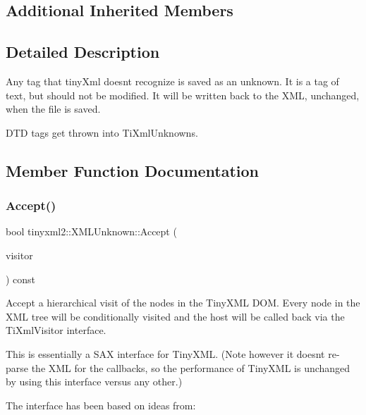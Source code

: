 \subsection*{Additional Inherited Members}


\subsection{Detailed Description}
Any tag that tiny\+Xml doesn\textquotesingle{}t recognize is saved as an unknown. It is a tag of text, but should not be modified. It will be written back to the X\+ML, unchanged, when the file is saved.

D\+TD tags get thrown into Ti\+Xml\+Unknowns. 

\subsection{Member Function Documentation}
\mbox{\label{classtinyxml2_1_1XMLUnknown_a8a06b8c82117ca969a432e17a46830fc}} 
\subsubsection{\texorpdfstring{Accept()}{Accept()}\hspace{0.1cm}{\footnotesize\ttfamily [1/2]}}
{\footnotesize\ttfamily bool tinyxml2\+::\+X\+M\+L\+Unknown\+::\+Accept (\begin{DoxyParamCaption}\item[{\hyperlink{classtinyxml2_1_1XMLVisitor}{X\+M\+L\+Visitor} $\ast$}]{visitor }\end{DoxyParamCaption}) const\hspace{0.3cm}{\ttfamily [virtual]}}

Accept a hierarchical visit of the nodes in the Tiny\+X\+ML D\+OM. Every node in the X\+ML tree will be conditionally visited and the host will be called back via the Ti\+Xml\+Visitor interface.

This is essentially a S\+AX interface for Tiny\+X\+ML. (Note however it doesn\textquotesingle{}t re-\/parse the X\+ML for the callbacks, so the performance of Tiny\+X\+ML is unchanged by using this interface versus any other.)

The interface has been based on ideas from\+:



